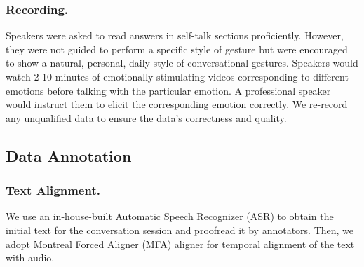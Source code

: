 \documentclass[runningheads]{llncs}
\begin{document}
\vspace{-0.5cm}

\subsubsection{Recording.} Speakers were asked to read answers in self-talk sections proficiently. However, they were not guided to perform a specific style of gesture but were encouraged to show a natural, personal, daily style of conversational gestures. Speakers would watch 2-10 minutes of emotionally stimulating videos corresponding to different emotions before talking with the particular emotion. A professional speaker would instruct them to elicit the corresponding emotion correctly. We re-record any unqualified data to ensure the data's correctness and quality.



\subsection{Data Annotation}
\subsubsection{Text Alignment.} We use an in-house-built Automatic Speech Recognizer (ASR) to obtain the initial text for the conversation session and proofread it by annotators. Then, we adopt Montreal Forced Aligner (MFA) aligner \cite{mcauliffe2017montreal} for temporal alignment of the text with audio.

\vspace{-0.5cm}
\end{document}
